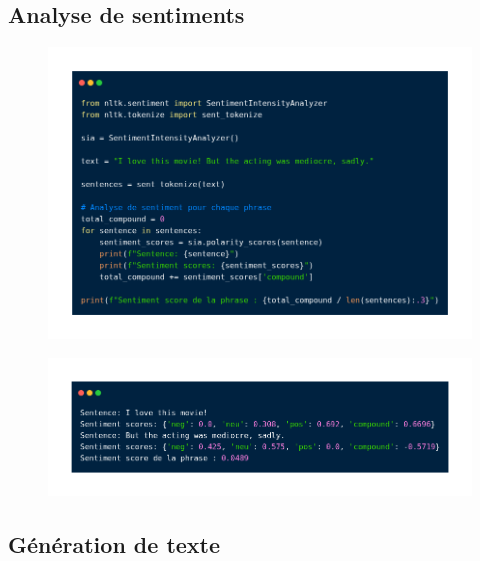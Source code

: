 \subsection{Analyse de sentiments}
\begin{frame}{\subsecname}
\begin{figure}[ht]
\includegraphics[scale=.32]{img/sentiment_nltk.png}

\end{figure}
\end{frame}

\begin{frame}{\subsecname}
\begin{figure}[ht]
\includegraphics[scale=.32]{img/sentiment_output_nltk.png}
\end{figure}
\end{frame}

\subsection{Génération de texte}

